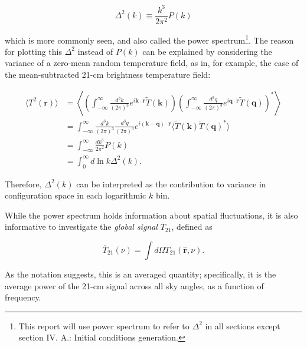 \documentclass[floats,floatfix,showpacs,amssymb,prd,superscriptaddress,nofootinbib, 11pt]{revtex4-2} %
\newcommand{\red}{\textcolor{red}}
\begin{document}
\begin{equation}
    \Delta^2 (k) \equiv \frac{k^3}{2\pi^2} P(k)
\end{equation}

\noindent which is more commonly seen, and also called the power spectrum\footnote{This report will use power spectrum to refer to $\Delta^2$ in all sections except section IV. A.: Initial conditions generation.}. The reason for plotting this $\Delta^2$ instead of $P(k)$ can be explained by considering the variance of a zero-mean random temperature field, as in, for example, the case of the mean-subtracted 21-cm brightness temperature field:

\begin{equation}
\begin{split}
    \langle T^2 (\textbf{r}) \rangle
    & = \left\langle \left( \int^\infty _{-\infty} \frac{d^3 k}{(2\pi)^3} e^{i \textbf{k} \cdot \textbf{r}} \tilde{T} (\textbf{k}) \right) \left( \int^\infty _{-\infty} \frac{d^3 q}{(2\pi)^3} e^{i \textbf{q} \cdot \textbf{r}} \tilde{T} (\textbf{q}) \right)^{*} \right\rangle \\
    & = \int^\infty _{-\infty} \frac{d^3 k}{(2\pi)^3} \frac{d^3 q}{(2\pi)^3} e^{i (\textbf{k} - \textbf{q}) \cdot \textbf{r}} \langle \tilde{T} (\textbf{k}) \tilde{T} (\textbf{q})^{*} \rangle \\
    & = \int^\infty _{-\infty} \frac{dk^3}{2\pi^2} P(k) \\
    & = \int^\infty _{0} d \ln k \Delta^2 (k).
\end{split}
\end{equation}

\noindent Therefore, $\Delta^2 (k)$ can be interpreted as the contribution to variance in configuration space in each logarithmic $k$ bin.

While the power spectrum holds information about spatial fluctuations, it is also informative to investigate the \textit{global signal} $\overline{T}_{21}$, defined as 

\begin{equation}
    \overline{T}_{21} (\nu) = \int d\Omega T_{21} (\hat{\textbf{r}}, \nu).
    \label{eq:global_signal}
\end{equation}

\noindent As the notation suggests, this is an averaged quantity; specifically, it is the average power of the 21-cm signal across all sky angles, as a function of frequency.


\end{document}
